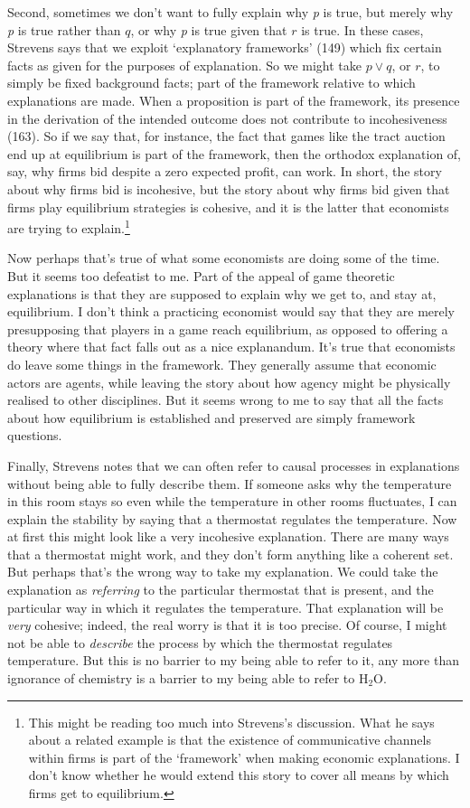 \documentclass[
  11pt,
  letterpaper,
  DIV=11,
  numbers=noendperiod,
  twoside]{scrartcl}
\begin{document}
Second, sometimes we don't want to fully explain why \emph{p} is true,
but merely why \emph{p} is true rather than \(q\), or why \emph{p} is
true given that \(r\) is true. In these cases, Strevens says that we
exploit `explanatory frameworks' (149) which fix certain facts as given
for the purposes of explanation. So we might take \(p \vee q\), or
\(r\), to simply be fixed background facts; part of the framework
relative to which explanations are made. When a proposition is part of
the framework, its presence in the derivation of the intended outcome
does not contribute to incohesiveness (163). So if we say that, for
instance, the fact that games like the tract auction end up at
equilibrium is part of the framework, then the orthodox explanation of,
say, why firms bid despite a zero expected profit, can work. In short,
the story about why firms bid is incohesive, but the story about why
firms bid given that firms play equilibrium strategies is cohesive, and
it is the latter that economists are trying to explain.\footnote{This
  might be reading too much into Strevens's discussion. What he says
  about a related example is that the existence of communicative
  channels within firms is part of the `framework' when making economic
  explanations. I don't know whether he would extend this story to cover
  all means by which firms get to equilibrium.}

Now perhaps that's true of what some economists are doing some of the
time. But it seems too defeatist to me. Part of the appeal of game
theoretic explanations is that they are supposed to explain why we get
to, and stay at, equilibrium. I don't think a practicing economist would
say that they are merely presupposing that players in a game reach
equilibrium, as opposed to offering a theory where that fact falls out
as a nice explanandum. It's true that economists do leave some things in
the framework. They generally assume that economic actors are agents,
while leaving the story about how agency might be physically realised to
other disciplines. But it seems wrong to me to say that all the facts
about how equilibrium is established and preserved are simply framework
questions.

Finally, Strevens notes that we can often refer to causal processes in
explanations without being able to fully describe them. If someone asks
why the temperature in this room stays so even while the temperature in
other rooms fluctuates, I can explain the stability by saying that a
thermostat regulates the temperature. Now at first this might look like
a very incohesive explanation. There are many ways that a thermostat
might work, and they don't form anything like a coherent set. But
perhaps that's the wrong way to take my explanation. We could take the
explanation as \emph{referring} to the particular thermostat that is
present, and the particular way in which it regulates the temperature.
That explanation will be \emph{very} cohesive; indeed, the real worry is
that it is too precise. Of course, I might not be able to
\emph{describe} the process by which the thermostat regulates
temperature. But this is no barrier to my being able to refer to it, any
more than ignorance of chemistry is a barrier to my being able to refer
to H\(_2\)O.
\end{document}
